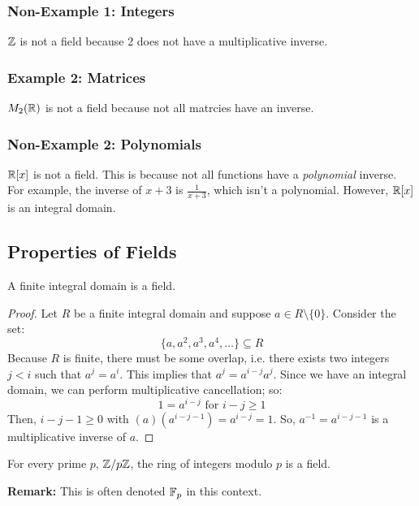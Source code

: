 \documentclass[letterpaper]{article}
\begin{document}
\subsubsection{Non-Example 1: Integers}
$\mathbb{Z}$ is not a field because 2 does not have a multiplicative inverse. 

\subsubsection{Example 2: Matrices}
$M_{2}(\mathbb{R})$ is not a field because not all matrcies have an inverse. 

\subsubsection{Non-Example 2: Polynomials}
$\mathbb{R}[x]$ is not a field. This is because not all functions have a \emph{polynomial} inverse. For example, the inverse of $x + 3$ is $\frac{1}{x + 3}$, which isn't a polynomial. However, $\mathbb{R}[x]$ is an integral domain. 

\subsection{Properties of Fields}

\begin{theorem}{}{}
    A finite integral domain is a field.
\end{theorem}

\begin{mdframed}[]
    \begin{proof}
        Let $R$ be a finite integral domain and suppose $a \in R \setminus \{0\}$. Consider the set: 
        \[\{a, a^2, a^3, a^4, \dots\} \subseteq R\]
        Because $R$ is finite, there must be some overlap, i.e. there exists two integers $j < i$ such that $a^j = a^i$. This implies that $a^j = a^{i - j} a^j$. Since we have an integral domain, we can perform multiplicative cancellation; so: 
        \[1 = a^{i - j} \text{ for } i - j \geq 1\]
        Then, $i - j - 1 \geq 0$ with $(a)(a^{i - j - 1}) = a^{i - j} = 1$. So, $a^{-1} = a^{i - j - 1}$ is a multiplicative inverse of $a$. 
    \end{proof}
\end{mdframed}

\begin{corollary}{}{}
    For every prime $p$, $\mathbb{Z} / p \mathbb{Z}$, the ring of integers modulo $p$ is a field.
\end{corollary}
\textbf{Remark:} This is often denoted $\mathbb{F}_p$ in this context. 
\end{document}
